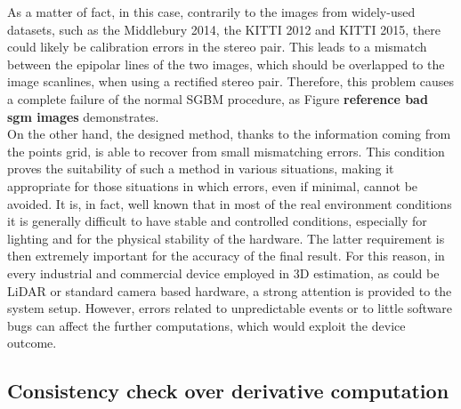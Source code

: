 As a matter of fact, in this case, contrarily to the images from widely-used datasets, such as the Middlebury 2014, the KITTI 2012 and KITTI 2015, there could likely be calibration errors in the stereo pair.
This leads to a mismatch between the epipolar lines of the two images, which should be overlapped to the image scanlines, when using a rectified stereo pair. 
Therefore, this problem causes a complete failure of the normal SGBM procedure, as Figure \textbf{reference bad sgm images} demonstrates.\\
On the other hand, the designed method, thanks to the information coming from the points grid, is able to recover from small mismatching errors.
This condition proves the suitability of such a method in various situations, making it appropriate for those situations in which errors, even if minimal, cannot be avoided. 
It is, in fact, well known that in most of the real environment conditions it is generally difficult to have stable and controlled conditions, especially for lighting and for the physical stability of the hardware. 
The latter requirement is then extremely important for the accuracy of the final result. 
For this reason, in every industrial and commercial device employed in 3D estimation, as could be LiDAR or standard camera based hardware, a strong attention is provided to the system setup. 
However, errors related to unpredictable events or to little software bugs can affect the further computations, which would exploit the device outcome. 

\subsection{Consistency check over derivative computation}
\label{subsection:result-consistency-check}

